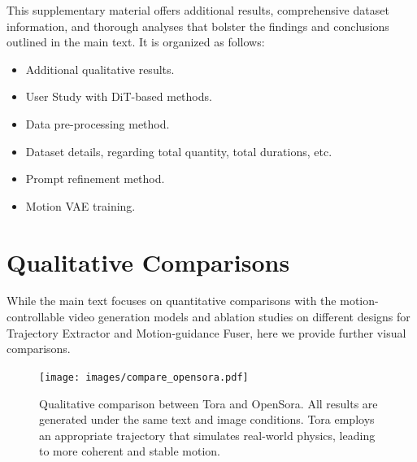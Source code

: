 This supplementary material offers additional results, comprehensive dataset information, and thorough analyses that bolster the findings and conclusions outlined in the main text. It is organized as follows:

\begin{itemize}
\item Additional qualitative results. 
\item User Study with DiT-based methods.
\item Data pre-processing method. %
\item Dataset details, regarding total quantity, total durations, etc. %
\item Prompt refinement method. %
\item Motion VAE training.
\end{itemize}

\section{Qualitative Comparisons}\label{sup.results}

While the main text focuses on quantitative comparisons with the motion-controllable video generation models and ablation studies on different designs for Trajectory Extractor and Motion-guidance Fuser, here we provide further visual comparisons.


\begin{figure}[!ht]
    \centering
    \texttt{[image: images/compare\_opensora.pdf]}
    \caption{
        Qualitative comparison between Tora and OpenSora. All results are generated under the same text and image conditions. Tora employs an appropriate trajectory that simulates real-world physics, leading to more coherent and stable motion.
    }
    \label{sup.f.opensora}   
\end{figure}

